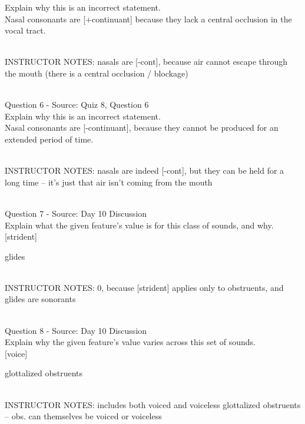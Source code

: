 \documentclass[12pt]{article}
\begin{document}
Explain why this is an incorrect statement.\\

Nasal consonants are {[+continuant]} because they lack a central occlusion in the vocal tract.


~\\
INSTRUCTOR NOTES: nasals are [-cont], because air cannot escape through the mouth (there is a central occlusion / blockage)


~\\

{\large Question 6} - Source: Quiz 8, Question 6\\

Explain why this is an incorrect statement.\\

Nasal consonants are {[-continuant]}, because they cannot be produced for an extended period of time.


~\\
INSTRUCTOR NOTES: nasals are indeed [-cont], but they can be held for a long time -- it's just that air isn't coming from the mouth


~\\

{\large Question 7} - Source: Day 10 Discussion\\

Explain what the given feature’s value is for this class of sounds, and why.\\

{[strident]}

glides


~\\
INSTRUCTOR NOTES: 0, because [strident] applies only to obstruents, and glides are sonorants


~\\

{\large Question 8} - Source: Day 10 Discussion\\

Explain why the given feature's value varies across this set of sounds.\\

{[voice]}

glottalized obstruents


~\\
INSTRUCTOR NOTES: includes both voiced and voiceless glottalized obstruents -- obs. can themselves be voiced or voiceless


~\\
\end{document}
